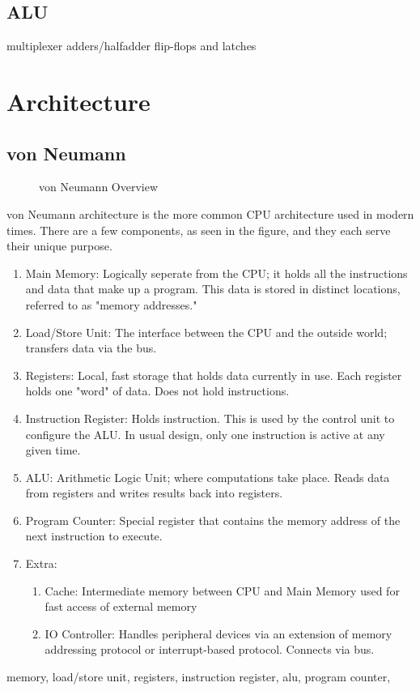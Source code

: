 \subsection{ALU}
multiplexer
adders/halfadder
flip-flops and latches

\section{Architecture}
\subsection{von Neumann}
\begin{figure}[!htb]
	\caption{\label{fig:vonover} von Neumann Overview}
\end{figure}
von Neumann architecture is the more common CPU architecture used in modern times. There are a few components, as seen in the figure, and they each serve their unique purpose.
\begin{enumerate}
	\item Main Memory: Logically seperate from the CPU; it holds all the instructions and data that make up a program. This data is stored in distinct locations, referred to as "memory addresses."
	\item Load/Store Unit: The interface between the CPU and the outside world; transfers data via the bus.
	\item Registers: Local, fast storage that holds data currently in use. Each register holds one "word" of data. Does not hold instructions.
	\item Instruction Register: Holds instruction. This is used by the control unit to configure the ALU. In usual design, only one instruction is active at any given time.
	\item ALU: Arithmetic Logic Unit; where computations take place. Reads data from registers and writes results back into registers.
	\item Program Counter: Special register that contains the memory address of the next instruction to execute.
	\item Extra:
	\begin{enumerate}
		\item Cache: Intermediate memory between CPU and Main Memory used for fast access of external memory
		\item IO Controller: Handles peripheral devices via an extension of memory addressing protocol or interrupt-based protocol. Connects via bus.
	\end{enumerate}
\end{enumerate}
memory, load/store unit, registers, instruction register, alu, program counter, 

